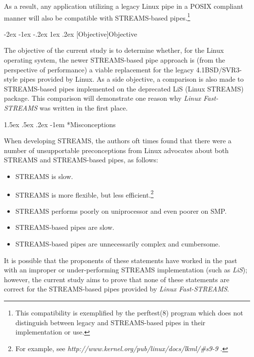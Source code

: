 \documentclass[letterpaper,final,notitlepage,twocolumn,10pt,twoside]{article}
\makeatletter
\renewcommand\section{\@startsection {section}{1}{\z@}%
                                   {-2ex \@plus -1ex \@minus -.2ex}%
                                   {1ex \@plus .2ex}%
                                   {\normalfont\large\bfseries}}
\renewcommand\paragraph{\@startsection{paragraph}{4}{\z@}%
                                    {1.5ex \@plus .5ex \@minus .2ex}%
                                    {-1em}%
                                    {\normalfont\normalsize\bfseries\slshape}}
\makeatother
\begin{document}
As a result, any application utilizing a legacy Linux pipe in a POSIX
compliant manner will also be compatible with STREAMS-based
pipes.\footnote{This compatibility is exemplified by the perftest(8) program
which does not distinguish between legacy and STREAMS-based pipes in their
implementation or use.}

\section[Objective]{Objective}

The objective of the current study is to determine whether, for the Linux
operating system, the newer STREAMS-based pipe approach is (from the
perspective of performance) a viable replacement for the legacy
4.1BSD/SVR3-style pipes provided by Linux.  As a side objective, a comparison
is also made to STREAMS-based pipes implemented on the deprecated LiS (Linux
STREAMS) package.  This comparison will demonstrate one reason why
\textsl{Linux Fast-STREAMS} was written in the first place.

\paragraph*{Misconceptions}

When developing STREAMS, the authors oft times found that there were a number
of unsupportable preconceptions from Linux advocates about both STREAMS and
STREAMS-based pipes, as follows:

\begin{itemize}

\item STREAMS is slow.

\item STREAMS is more flexible, but less efficient.\footnote{For example, see
\textit{http://www.kernel.org/pub/linux/docs/lkml/\#s9-9} .}

\item STREAMS performs poorly on uniprocessor and even poorer on SMP.

\item STREAMS-based pipes are slow.

\item STREAMS-based pipes are unnecessarily complex and cumbersome.

\end{itemize}

It is possible that the proponents of these statements have worked in the past
with an improper or under-performing STREAMS implementation (such as
\textsl{LiS}); however, the current study aims to prove that none of these
statements are correct for the STREAMS-based pipes provided by \textsl{Linux
Fast-STREAMS}.
\end{document}
